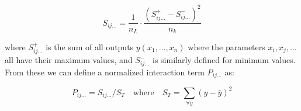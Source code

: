 \begin{equation}
	S_{ij\dots} = \frac{1}{n_L} \cdot \frac{(S_{ij\dots}^+ - S_{ij\dots}^-)^2}{n_k}
\end{equation}

where $S_{ij\dots}^+$ is the sum of all outputs $y(x_1, \dots, x_n)$ where the parameters $x_i, x_j, \dots$ all have their maximum values, and $S_{ij\dots}^-$ is similarly defined for minimum values. From these we can define a normalized interaction term $P_{ij\dots}$ as:

\begin{equation}
	P_{ij\dots} = S_{ij\dots} / S_T \quad \text{where} \quad S_T = \sum_{\forall y} (y - \bar{y})^2
\end{equation}